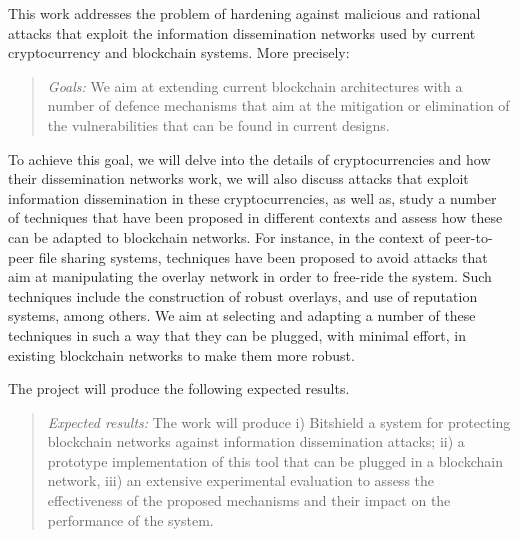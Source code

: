 This work addresses the problem of hardening against malicious and rational attacks that exploit the information dissemination networks used by current cryptocurrency and blockchain systems. More precisely:

\begin{quotation} 
\textit{Goals:} We aim at extending current blockchain architectures with a number of defence mechanisms that aim at the mitigation or elimination of the vulnerabilities that can be found in current designs.
\end{quotation} 
 
To achieve this goal, we will delve into the details of cryptocurrencies and how their dissemination networks work, we will also discuss attacks that exploit information dissemination in these cryptocurrencies, as well as, study a number of techniques that have been proposed in different contexts and assess how these can be adapted to blockchain networks. For instance, in the context of peer-to-peer file sharing systems, techniques have been proposed to avoid attacks that aim at manipulating the overlay network in order to free-ride the system. Such techniques include the construction of robust overlays, and use of reputation systems, among others. We aim at selecting and adapting a number of these techniques in such a way that they can be plugged, with minimal effort, in existing blockchain networks to make them more robust.

The project will produce the following expected results. 
 
\begin{quotation} 
  \textit{Expected results:} The work will produce 
  i) Bitshield a system for protecting blockchain networks against information dissemination attacks; 
  ii) a prototype implementation of this tool that can be plugged in a blockchain network, 
  iii) an extensive experimental evaluation to assess the effectiveness of the proposed mechanisms and their impact on the performance of the system.
\end{quotation} 

